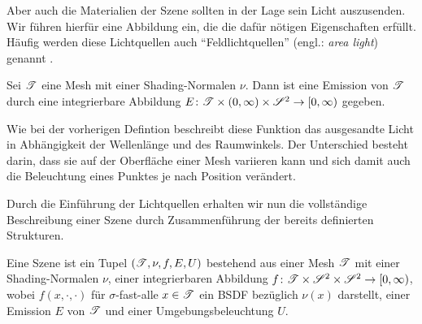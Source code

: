 		Aber auch die Materialien der Szene sollten in der Lage sein Licht auszusenden.
		Wir führen hierfür eine Abbildung ein, die die dafür nötigen Eigenschaften erfüllt.
		Häufig werden diese Lichtquellen auch \enquote{Feldlichtquellen} (engl.: \textit{area light}) genannt \cite[S.~733~ff]{pbrt3}.
		\begin{definition}[Emission]
			Sei $\mathscr{T}$ eine Mesh mit einer Shading-Normalen $\nu$.
			Dann ist eine Emission von $\mathscr{T}$ durch eine integrierbare Abbildung $E\colon\mathscr{T}\times(0,\infty)\times\mathscr{S}^{2}\to[0,\infty)$ gegeben.
		\end{definition}

		Wie bei der vorherigen Defintion beschreibt diese Funktion das ausgesandte Licht in Abhängigkeit der Wellenlänge und des Raumwinkels.
		Der Unterschied besteht darin, dass sie auf der Oberfläche einer Mesh variieren kann und sich damit auch die Beleuchtung eines Punktes je nach Position verändert.

		Durch die Einführung der Lichtquellen erhalten wir nun die vollständige Beschreibung einer Szene durch Zusammenführung der bereits definierten Strukturen.
		\begin{definition}[Szene]
			Eine Szene ist ein Tupel $(\mathscr{T},\nu,f,E,U)$ bestehend aus einer Mesh $\mathscr{T}$ mit einer Shading-Normalen $\nu$, einer integrierbaren Abbildung $f\colon\mathscr{T}\times\mathscr{S}^{2}\times\mathscr{S}^{2}\to[0,\infty)$, wobei $f(x,\cdot,\cdot)$ für $\sigma$-fast-alle $x\in\mathscr{T}$ ein BSDF bezüglich $\nu(x)$ darstellt, einer Emission $E$ von $\mathscr{T}$ und einer Umgebungsbeleuchtung $U$.
		\end{definition}






